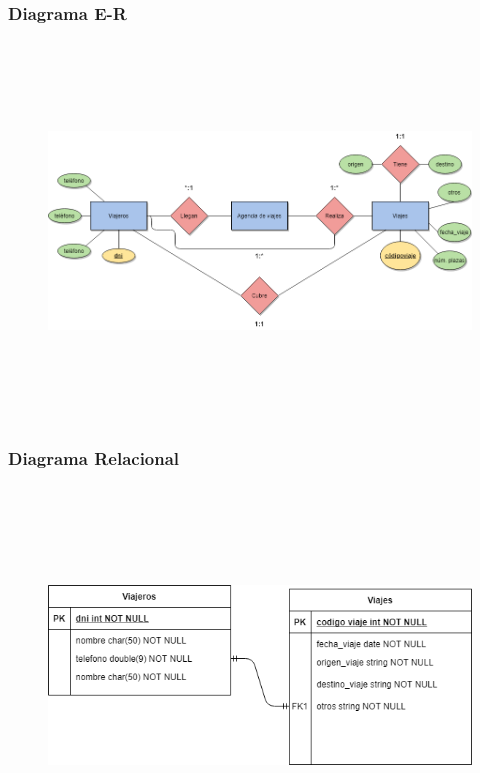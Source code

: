 \documentclass[a4paper, 12pt]{article}
\begin{document}
\begin{justify}
        \subsubsection{Diagrama E-R}
        \begin{figure}[H]
            \centering
            \includegraphics[width=16cm,height=10cm]{er6.png}
        \end{figure}
        \subsubsection{Diagrama Relacional}
        \begin{figure}[H]
            \centering
            \includegraphics[width=16cm,height=10cm]{rel6.png}
        \end{figure}

\end{justify}
\end{document}
